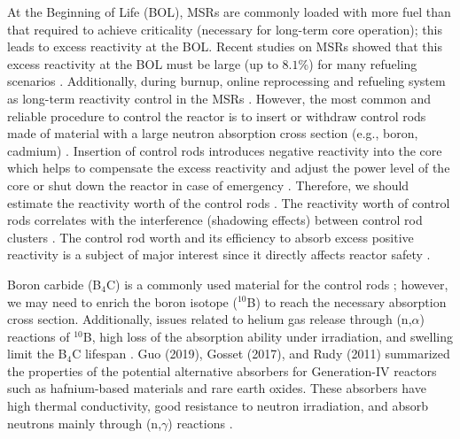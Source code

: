 At the Beginning of Life (BOL), MSRs are commonly loaded with more
fuel than that required to achieve criticality (necessary for long-term core 
operation); this leads to excess reactivity at the BOL. Recent studies on MSRs showed that this excess reactivity 
at the BOL must be large (up to $8.1$\%) for many refueling scenarios
\cite{rykhlevskii2019modeling,betzler2016modeling,ashraf2020Strategies,ashraf2018nuclear,ashraf2020whole,ashraf2019modeling}.
Additionally, during burnup, online reprocessing and refueling system as long-term reactivity control in
the MSRs \cite{ashraf2020whole,ashraf2019Preliminary}. However, the most common and reliable procedure 
to control the reactor is to insert or withdraw control rods made of material 
with a large neutron absorption cross section (e.g., boron, cadmium) 
\cite{duderstadt650nuclear}. 
Insertion of control rods introduces negative reactivity into the 
core which helps to compensate the excess reactivity and 
adjust the power level of the core or shut down the reactor in case of 
emergency \cite{glasstone1967nuclear}. Therefore, we should estimate 
the reactivity worth of the control rods 
\cite{varvayanni2009estimation,fadaei2009control,aoyama2007core,bretscher1997computing}.
 The reactivity worth of control rods correlates with the interference 
(shadowing effects) between control rod clusters 
\cite{girardin2008development,vcerba2017optimization}. 
The control rod worth and its efficiency to absorb excess positive reactivity is a subject of major interest since it directly affects reactor safety \cite{liu2018criticality,atkinson2019small,vcerba2017optimization,do2019criticality,guo2019advanced,varvayanni2009estimation}.

Boron carbide (B$_4$C) is a commonly used material for the control rods 
\cite{zhong2019preliminary,steinbruck2010degradation,dunner1984absorber}; 
however, we may need to enrich the boron isotope ($^{10}$B) to reach 
the necessary absorption cross section. Additionally, issues related to helium gas release through (n,$\alpha$) reactions of $^{10}$B, high loss of the absorption ability under irradiation, and swelling limit the B$_4$C lifespan 
\cite{guo2019optimized}. Guo (2019), Gosset (2017), and Rudy (2011) summarized the properties of the 
potential alternative absorbers for Generation-IV reactors such as 
hafnium-based materials and rare earth oxides. These absorbers have 
high thermal conductivity, good resistance to neutron irradiation, and
absorb neutrons mainly through (n,$\gamma$) reactions
\cite{guo2019optimized,gosset2017absorber,konings2011comprehensive}.

